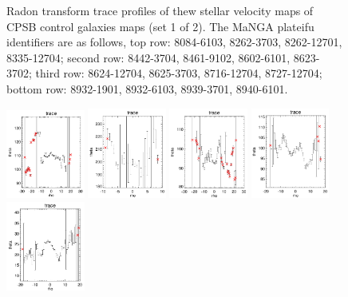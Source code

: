 \documentclass[fleqn,usenatbib]{mnras}
\begin{document}
\begin{figure}
    \caption{Radon transform trace profiles of thew stellar velocity maps of CPSB control galaxies maps (set 1 of 2). The MaNGA plateifu identifiers are as follows, top row: 8084-6103, 8262-3703, 8262-12701, 8335-12704; second row: 8442-3704, 8461-9102, 8602-6101, 8623-3702; third row: 8624-12704, 8625-3703, 8716-12704, 8727-12704; bottom row: 8932-1901, 8932-6103, 8939-3701, 8940-6101.}
    \label{fig:Radon-traces-CPSB-controls-1}
\end{figure}

\begin{figure}
    \centering
    \includegraphics[width=0.23\textwidth]{Images/trace-plots/trace-plots-cpsb-controls/8945-12703.png}
    \includegraphics[width=0.23\textwidth]{Images/trace-plots/trace-plots-cpsb-controls/8992-1902.png}
    \includegraphics[width=0.23\textwidth]{Images/trace-plots/trace-plots-cpsb-controls/8995-9101.png}
    \includegraphics[width=0.23\textwidth]{Images/trace-plots/trace-plots-cpsb-controls/9029-6103.png}
    \includegraphics[width=0.23\textwidth]{Images/trace-plots/trace-plots-cpsb-controls/9043-6104.png}

\end{figure}
\end{document}
